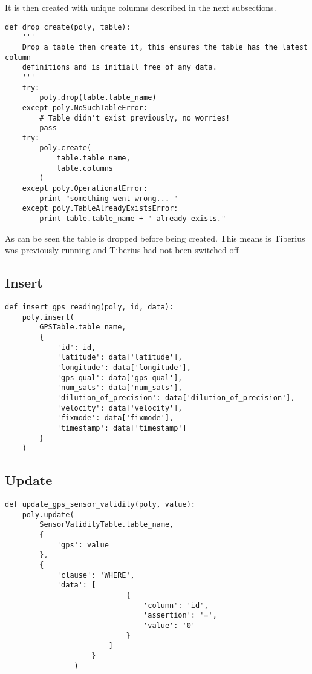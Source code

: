 It is then created with unique columns described in the next subsections.

\begin{lstlisting}
def drop_create(poly, table):
    '''
    Drop a table then create it, this ensures the table has the latest column
    definitions and is initiall free of any data.
    '''
    try:
        poly.drop(table.table_name)
    except poly.NoSuchTableError:
        # Table didn't exist previously, no worries!
        pass
    try:
        poly.create(
            table.table_name,
            table.columns
        )
    except poly.OperationalError:
        print "something went wrong... "
    except poly.TableAlreadyExistsError:
        print table.table_name + " already exists."
\end{lstlisting}
As can be seen the table is dropped before being created. This means is Tiberius was previously running and Tiberius had not been switched off

\subsection{Insert}
\begin{lstlisting}
def insert_gps_reading(poly, id, data):
    poly.insert(
        GPSTable.table_name,
        {
            'id': id,
            'latitude': data['latitude'],
            'longitude': data['longitude'],
            'gps_qual': data['gps_qual'],
            'num_sats': data['num_sats'],
            'dilution_of_precision': data['dilution_of_precision'],
            'velocity': data['velocity'],
            'fixmode': data['fixmode'],
            'timestamp': data['timestamp']
        }
    )
\end{lstlisting}
\subsection{Update}
\begin{lstlisting}
def update_gps_sensor_validity(poly, value):
    poly.update(
        SensorValidityTable.table_name,
        {
            'gps': value
        },
        {
            'clause': 'WHERE',
            'data': [
                            {
                                'column': 'id',
                                'assertion': '=',
                                'value': '0'
                            }
                        ]
                    }
                )
\end{lstlisting}

